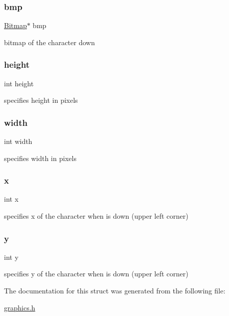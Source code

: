 \subsubsection{\texorpdfstring{bmp}{bmp}}
{\footnotesize\ttfamily \hyperlink{struct_bitmap}{Bitmap}$\ast$ bmp}



bitmap of the character down 

\mbox{\label{struct_down_character_ad12fc34ce789bce6c8a05d8a17138534}} 
\subsubsection{\texorpdfstring{height}{height}}
{\footnotesize\ttfamily int height}



specifies height in pixels 

\mbox{\label{struct_down_character_a2474a5474cbff19523a51eb1de01cda4}} 
\subsubsection{\texorpdfstring{width}{width}}
{\footnotesize\ttfamily int width}



specifies width in pixels 

\mbox{\label{struct_down_character_a6150e0515f7202e2fb518f7206ed97dc}} 
\subsubsection{\texorpdfstring{x}{x}}
{\footnotesize\ttfamily int x}



specifies x of the character when is down (upper left corner) 

\mbox{\label{struct_down_character_a0a2f84ed7838f07779ae24c5a9086d33}} 
\subsubsection{\texorpdfstring{y}{y}}
{\footnotesize\ttfamily int y}



specifies y of the character when is down (upper left corner) 



The documentation for this struct was generated from the following file\+:\begin{DoxyCompactItemize}
\item 
\hyperlink{graphics_8h}{graphics.\+h}\end{DoxyCompactItemize}
